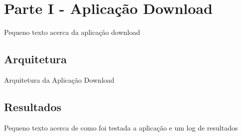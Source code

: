 \section*{Parte I - Aplicação Download}
Pequeno texto acerca da aplicação download

\subsection*{Arquitetura}
Arquitetura da Aplicação Download

\subsection*{Resultados}
Pequeno texto acerca de como foi testada a aplicação e um log de resultados